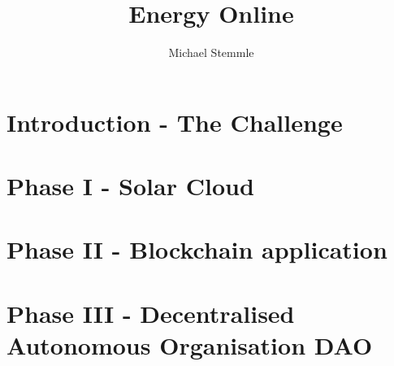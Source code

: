 \documentclass{scrartcl}
\begin{document}
	
	\title{Energy Online}
	\subtitle{}
	\author{Michael Stemmle}
	
	\maketitle
	
	\section*{Introduction - The Challenge}
	
	\section*{Phase I - Solar Cloud}
	
	\section*{Phase II - Blockchain application}
	
	\section*{Phase III - Decentralised Autonomous Organisation DAO}
	
\end{document}
